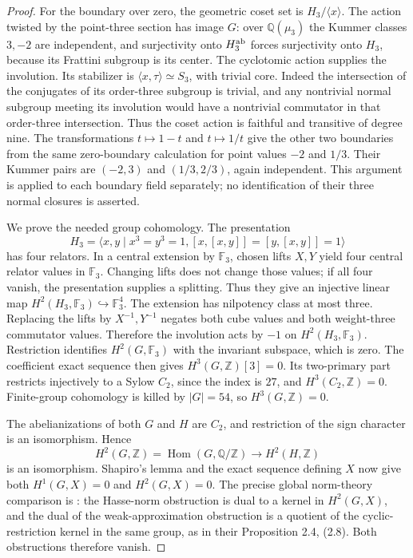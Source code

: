 \begin{proof}
For the boundary over zero, the geometric coset set is
$H_3/\langle x\rangle$. The action twisted by the point-three
section has image $G$: over $\mathbb Q(\mu_3)$ the Kummer classes
$3,-2$ are independent, and surjectivity onto $H_3^{\rm ab}$ forces
surjectivity onto $H_3$, because its Frattini subgroup is its center.
The cyclotomic action supplies the involution. Its stabilizer is
$\langle x,\tau\rangle\simeq S_3$, with trivial core. Indeed the
intersection of the conjugates of its order-three subgroup is trivial,
and any nontrivial normal subgroup meeting its involution would have
a nontrivial commutator in that order-three intersection. Thus the
coset action is faithful and transitive of degree nine.
The transformations $t\mapsto1-t$ and $t\mapsto1/t$ give the other
two boundaries from the same zero-boundary calculation for point
values $-2$ and $1/3$. Their Kummer pairs are $(-2,3)$ and
$(1/3,2/3)$, again independent. This argument is applied to each
boundary field separately; no identification of their three normal
closures is asserted.

We prove the needed group cohomology. The presentation
\[
 H_3=\langle x,y\mid x^3=y^3=1,
 [x,[x,y]]=[y,[x,y]]=1\rangle
\]
has four relators. In a central extension by $\mathbb F_3$, chosen
lifts $X,Y$ yield four central relator values in $\mathbb F_3$.
Changing lifts does not change those values; if all four vanish,
the presentation supplies a splitting. Thus they give an injective
linear map $H^2(H_3,\mathbb F_3)\hookrightarrow\mathbb F_3^4$.
The extension has nilpotency class at most three. Replacing the
lifts by $X^{-1},Y^{-1}$ negates both cube values and both
weight-three commutator values. Therefore the involution acts by
$-1$ on $H^2(H_3,\mathbb F_3)$. Restriction identifies
$H^2(G,\mathbb F_3)$ with the invariant subspace, which is zero.
The coefficient exact sequence then gives $H^3(G,\mathbb Z)[3]=0$.
Its two-primary part restricts injectively to a Sylow $C_2$, since
the index is $27$, and $H^3(C_2,\mathbb Z)=0$. Finite-group
cohomology is killed by $|G|=54$, so $H^3(G,\mathbb Z)=0$.

The abelianizations of both $G$ and $H$ are $C_2$, and restriction
of the sign character is an isomorphism. Hence
\[
 H^2(G,\mathbb Z)=\operatorname{Hom}(G,\mathbb Q/\mathbb Z)
   \longrightarrow H^2(H,\mathbb Z)
\]
is an isomorphism. Shapiro's lemma and the exact sequence defining
$X$ now give both $H^1(G,X)=0$ and $H^2(G,X)=0$.
The precise global norm-theory comparison is
\citet[Theorems 2.1--2.3, (2.4), (2.6), pp.~496--498]{AuditMacedoNewton}:
the Hasse-norm obstruction is dual to a kernel in $H^2(G,X)$,
and the dual of the weak-approximation obstruction is a quotient
of the cyclic-restriction kernel in the same group, as in their
Proposition 2.4, (2.8). Both obstructions therefore vanish.


\end{proof}
